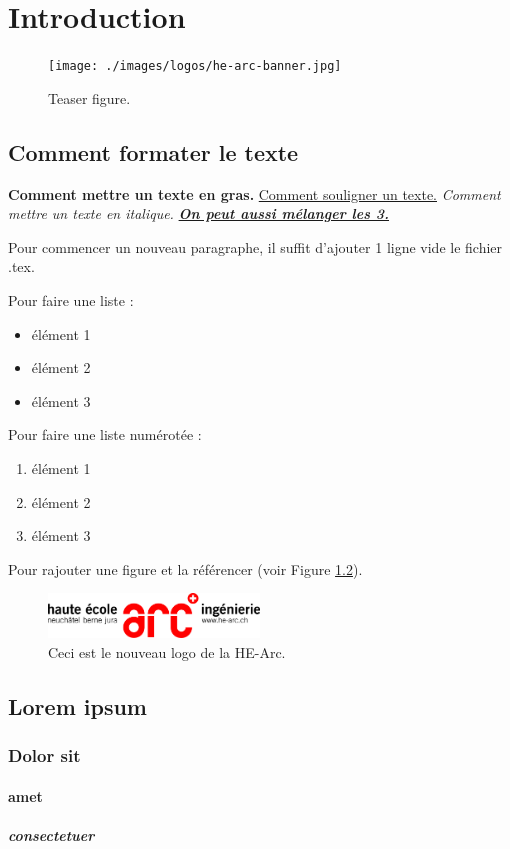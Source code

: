 \chapter{Introduction}
\begin{figure}[h]
  \centering
  \texttt{[image: ./images/logos/he-arc-banner.jpg]}
  \caption{Teaser figure.}
  \label{Fig_teaser}
\end{figure}

\section{Comment formater le texte}
\textbf{Comment mettre un texte en gras.}
\underline{Comment souligner un texte.} 
\textit{Comment mettre un texte en italique.}
\underline{\textbf{\textit{On peut aussi mélanger les 3.}}}

Pour commencer un nouveau paragraphe, il suffit d'ajouter 1 ligne vide le fichier .tex.

Pour faire une liste :
\begin{itemize}
    \item élément 1
    \item élément 2
    \item élément 3
\end{itemize}

Pour faire une liste numérotée :
\begin{enumerate}
    \item élément 1
    \item élément 2
    \item élément 3
\end{enumerate}

Pour rajouter une figure et la référencer (voir Figure \ref{Fig_exemple}).
\begin{figure}[h]
    \centering
    \includegraphics[width=0.5\textwidth]{./images/logos/he-arc-logo.png}
    \caption{Ceci est le nouveau logo de la HE-Arc.}
    \label{Fig_exemple}
\end{figure}

\section{Lorem ipsum}
\lipsum[1-1] %
\subsection{Dolor sit}
\lipsum[1-1] %
\subsubsection{amet}
\lipsum[1-1] %
\paragraph{consectetuer}
\lipsum[1-1] %